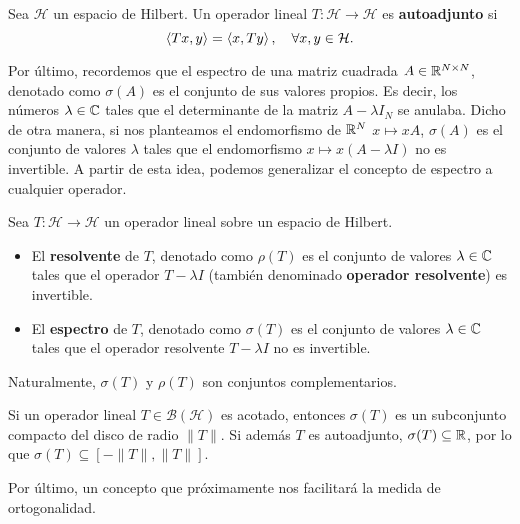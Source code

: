     \begin{definicion}
        Sea $\mathcal{H}$ un espacio de Hilbert. Un operador lineal $T:\mathcal H \longrightarrow \mathcal{H}$ es \textbf{autoadjunto} si
        \begin{equation}
            \label{eq:operador-autoadjunto}
            \left\langle Tx , y \right\rangle = \left\langle x , Ty \right\rangle, \ \ \ \forall x,y\in \mathcal H.
        \end{equation}
    \end{definicion}

    Por último, recordemos que el espectro de una matriz cuadrada $A\in\mathbb{R}^{N\times N}$, denotado como $\sigma(A)$ es el conjunto de sus valores propios. Es decir, los números $\lambda\in\mathbb{C}$ tales que el determinante de la matriz $A-\lambda I_N$ se anulaba. Dicho de otra manera, si nos planteamos el endomorfismo de $\mathbb{R}^N$ $x\mapsto xA$, $\sigma(A)$ es el conjunto de valores $\lambda$ tales que el endomorfismo $x\mapsto x(A-\lambda I)$ no es invertible. A partir de esta idea, podemos generalizar el concepto de espectro a cualquier operador.
    
    \begin{definicion}
        Sea $T:\mathcal H \longrightarrow \mathcal{H}$ un operador lineal sobre un espacio de Hilbert. 
        \begin{itemize}
            \item El \textbf{resolvente} de $T$, denotado como $\rho(T)$ es el conjunto de valores $\lambda\in\mathbb{C}$ tales que el operador $T-\lambda I$ (también denominado \textbf{operador resolvente}) es invertible.
            \item El \textbf{espectro} de $T$, denotado como $\sigma(T)$ es el conjunto de valores $\lambda\in\mathbb{C}$ tales que el operador resolvente $T-\lambda I$ no es invertible.
        \end{itemize}
        Naturalmente, $\sigma(T)$ y $\rho(T)$ son conjuntos complementarios.
    \end{definicion}

    Si un operador lineal $T\in\mathcal{B}(\mathcal{H})$ es acotado, entonces $\sigma(T)$ es un subconjunto compacto del disco de radio $\|T\|$. Si además $T$ es autoadjunto, $\sigma(T)\subseteq\mathbb{R}$, por lo que $\sigma(T)\subseteq[-\|T\|,\|T\|]$.

    Por último, un concepto que próximamente nos facilitará la medida de ortogonalidad.
    
